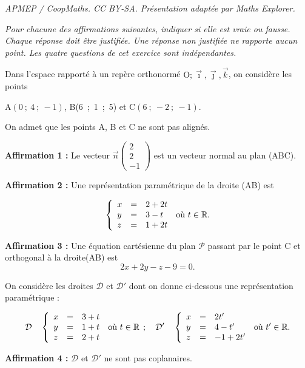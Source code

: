 \documentclass[10pt]{article}
\providecommand{\R}{\mathbb{R}}
\providecommand{\vect}[1]{\overrightarrow{#1}}
\providecommand{\Oijk}{\(\mathrm{O};\vec{\imath},\vec{\jmath},\vec{k}\)}
\begin{document}
\noindent\textit{APMEP / CoopMaths. CC BY-SA. Présentation adaptée par Maths Explorer.}\par\medskip
\medskip

\emph{Pour chacune des affirmations suivantes, indiquer si elle est vraie ou fausse. Chaque réponse doit être justifiée. Une réponse non justifiée ne rapporte aucun point.
Les quatre questions de cet exercice sont indépendantes.}

\medskip

Dans l'espace rapporté à un repère orthonormé \Oijk, on considère les points 
\begin{center}A$(0~;~ 4~;~-1)$, \quad B(6~;~1~;~5) \quad et \quad C$(6~;~-2~;~-1)$.\end{center} 

On admet que les points A, B et C ne sont pas alignés.

\medskip

\textbf{Affirmation 1 :} Le vecteur $\vect{n}\begin{pmatrix}2\\2\\-1\end{pmatrix}$ est un vecteur normal au plan (ABC).

\medskip

\textbf{Affirmation 2 :} Une représentation paramétrique de la droite (AB) est 

\[\left\{\begin{array}{l c l}
x &=& 2 + 2t\\
y &=& 3 - t\\
z &=& 1 + 2t
\end{array}\right. \:\text{où } t \in \R.\]

\medskip

\textbf{Affirmation 3 :} Une équation cartésienne du plan $\mathcal{P}$ passant par le point C et orthogonal à la droite(AB) est
\[2x + 2y - z- 9 = 0.\]

\bigskip

On considère les droites $\mathcal{D}$ et $\mathcal{D}'$ dont on donne ci-dessous une représentation paramétrique :

\[\mathcal{D}\quad \left\{\begin{array}{l c l}
x&=&3+t\\
y&=&1+t\\
z&=&2+t
\end{array}\right. \:\text{où } t \in \R \:\:;\quad
\mathcal{D}'\quad \left\{\begin{array}{l c l}
x&= &2t'\\
y&=&4 - t'\\
z&=&-1 + 2t'
\end{array}\right. \:\text{où } t' \in \R.\]

\textbf{Affirmation 4 :} $\mathcal{D}$ et $\mathcal{D}'$ ne sont pas coplanaires.

\bigskip
\end{document}
